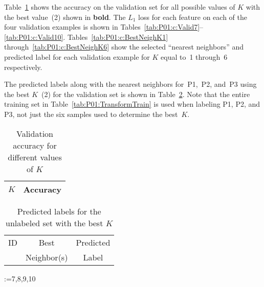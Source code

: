 Table~\ref{tab:P01:c:AccVsK} shows the accuracy on the validation set for all possible values of $K$ with the best value~(2) shown in \textbf{bold}.  The $L_1$ loss for each feature on each of the four validation examples is shown in Tables~\ref{tab:P01:c:Valid7}--\ref{tab:P01:c:Valid10}.  Tables~\ref{tab:P01:c:BestNeighK1} through~\ref{tab:P01:c:BestNeighK6} show the selected ``nearest neighbors'' and predicted label for each validation example for $K$ equal to~1 through~6 respectively.

The predicted labels along with the nearest neighbors for~P1,~P2, and~P3 using the best $K$~(2) for the validation set is shown in Table~\ref{tab:P01:c:UnlabelBestK}.  Note that the entire training set in Table~\ref{tab:P01:TransformTrain} is used when labeling P1, P2, and P3, not just the six samples used to determine the best~$K$.

\begin{table}[h]
  \centering
  \caption{Validation accuracy for different values of $K$}\label{tab:P01:c:AccVsK}
  \begin{tabular}{|c|c|}
    \hline
    $K$ & Accuracy \\\hline\hline
    
  \end{tabular}
\end{table}

\begin{table}[h]
  \centering
  \caption{Predicted labels for the unlabeled set with the best $K$}\label{tab:P01:c:UnlabelBestK}
  \begin{tabular}{|c||c|c|}
    \hline
    ID & Best        & Predicted \\
       & Neighbor(s) & Label  \\\hline\hline
    
  \end{tabular}
\end{table}

\@for\id:={7,8,9,10}


